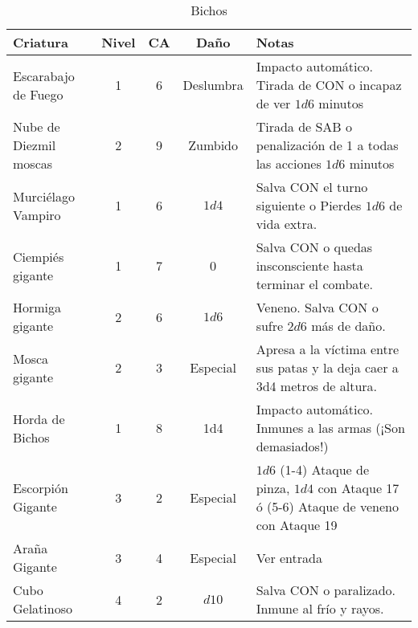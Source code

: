 \begin{table*}[p]
\caption{Bichos}
\label{c:bichos}
\centering
\begin{threeparttable}
\begin{tabular}{lcccp{8cm}}
\toprule
Criatura             & Nivel &   CA & Daño & Notas\\
\midrule
Escarabajo de Fuego  &  1 & 6 & Deslumbra &  Impacto automático. Tirada de CON o incapaz de ver $ 1d6$ minutos\\
Nube de Diezmil moscas& 2 & 9 & Zumbido & Tirada de SAB o penalización de 1 a todas las acciones $1d6$ minutos\\
Murciélago Vampiro   & 1 & 6 & $ 1d4$ & Salva CON el turno siguiente o Pierdes $ 1d6$ de vida extra.\\
Ciempiés gigante     & 1 & 7 & 0 & Salva CON o quedas insconsciente hasta terminar el combate.\\
\midrule
Hormiga gigante      & 2 & 6 & $ 1d6$ & Veneno. Salva CON o sufre $ 2d6$ más de daño.\\
Mosca gigante        & 2 & 3 & Especial & Apresa a la víctima entre sus patas y la deja caer a 3d4 metros de altura.\\
Horda de Bichos      &  1 &  8  & 1d4 & Impacto automático. Inmunes a las armas (¡Son demasiados!)\\
\midrule
Escorpión Gigante    & 3 & 2 & Especial & $1d6$ (1-4) Ataque de pinza, $1d4$ con Ataque 17 ó (5-6) Ataque de veneno con Ataque 19\\
Araña Gigante        & 3 & 4 & Especial & Ver entrada\\
\midrule
Cubo Gelatinoso      & 4 & 2 &$  d10$ & Salva CON o paralizado. Inmune al frío y rayos.\\

\midrule

\bottomrule
\end{tabular}

\end{threeparttable}
\end{table*}


